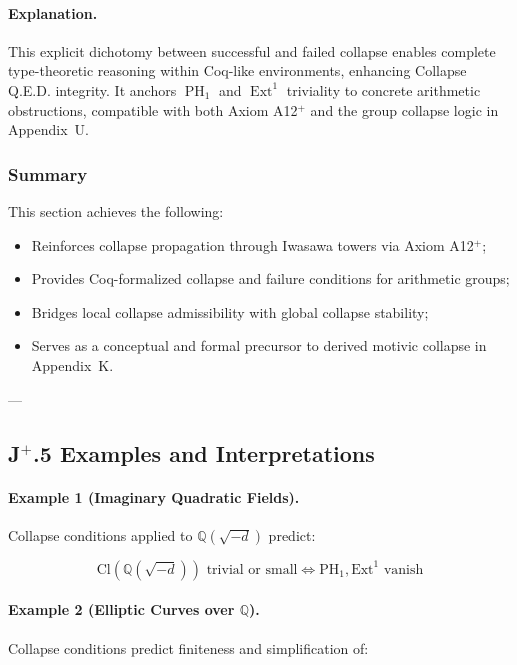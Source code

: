 \documentclass[11pt]{article}
\DeclareMathOperator{\Ext}{Ext}
\DeclareMathOperator{\PH}{PH}
\begin{document}
\paragraph{Explanation.}
This explicit dichotomy between successful and failed collapse enables complete type-theoretic reasoning within Coq-like environments, enhancing Collapse Q.E.D. integrity. It anchors $\PH_1$ and $\Ext^1$ triviality to concrete arithmetic obstructions, compatible with both Axiom A12$^{+}$ and the group collapse logic in Appendix~U.

\subsubsection*{Summary}

This section achieves the following:
\begin{itemize}
  \item Reinforces collapse propagation through Iwasawa towers via Axiom A12$^{+}$;
  \item Provides Coq-formalized collapse and failure conditions for arithmetic groups;
  \item Bridges local collapse admissibility with global collapse stability;
  \item Serves as a conceptual and formal precursor to derived motivic collapse in Appendix~K.
\end{itemize}

---

\subsection*{J$^{+}$.5 Examples and Interpretations}

\paragraph{Example 1 (Imaginary Quadratic Fields).}

Collapse conditions applied to $\mathbb{Q}(\sqrt{-d})$ predict:

\[
\mathrm{Cl}(\mathbb{Q}(\sqrt{-d})) \text{ trivial or small} \iff \mathrm{PH}_1, \mathrm{Ext}^1 \text{ vanish}
\]

\paragraph{Example 2 (Elliptic Curves over $\mathbb{Q}$).}

Collapse conditions predict finiteness and simplification of:
\end{document}
